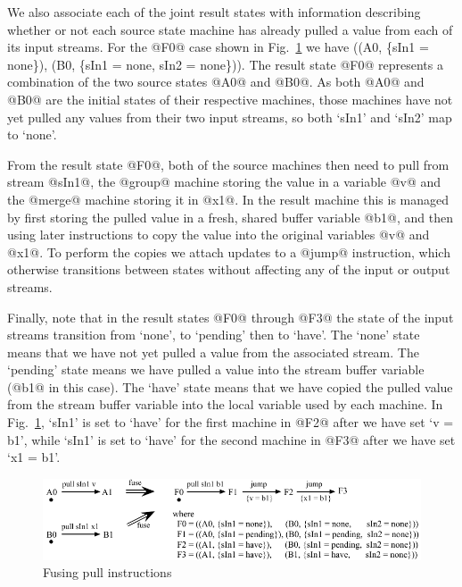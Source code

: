 We also associate each of the joint result states with information describing whether or not each source state machine has already pulled a value from each of its input streams. For the @F0@ case shown in Fig.~\ref{fig:Fusion:Pulls} we have ((A0, \{sIn1 = none\}), (B0, \{sIn1 = none, sIn2 = none\})). The result state @F0@ represents a combination of the two source states @A0@ and @B0@. As both @A0@ and @B0@ are the initial states of their respective machines, those machines have not yet pulled any values from their two input streams, so both `sIn1' and `sIn2' map to `none'.

From the result state @F0@, both of the source machines then need to pull from stream @sIn1@, the @group@ machine storing the value in a variable @v@ and the @merge@ machine storing it in @x1@. In the result machine this is managed by first storing the pulled value in a fresh, shared buffer variable @b1@, and then using later instructions to copy the value into the original variables @v@ and @x1@. To perform the copies we attach updates to a @jump@ instruction, which otherwise transitions between states without affecting any of the input or output streams.

Finally, note that in the result states @F0@ through @F3@ the state of the input streams transition from `none', to `pending' then to `have'. The `none' state means that we have not yet pulled a value from the associated stream. The `pending' state means we have pulled a value into the stream buffer variable (@b1@ in this case). The `have' state means that we have copied the pulled value from the stream buffer variable into the local variable used by each machine. In Fig.~\ref{fig:Fusion:Pulls},  `sIn1' is set to `have' for the first machine in @F2@ after we have set `v = b1', while `sIn1' is set to `have' for the second machine in @F3@ after we have set `x1 = b1'. 


\begin{figure}
\includegraphics[scale=1.1]{copy/03-body/process/figures/fuse-pull-pull.pdf}
\caption{Fusing pull instructions}
\label{fig:Fusion:Pulls}
\end{figure}


